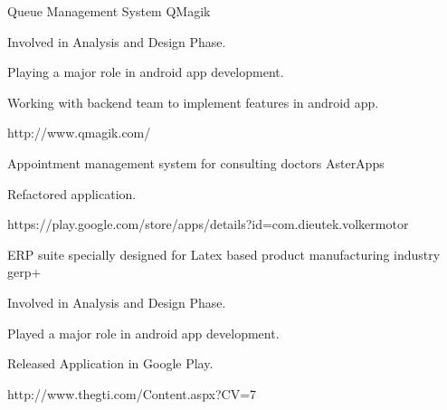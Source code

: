 

\begin{cventries}

\cventry
    {Queue Management System} %
    {QMagik} %
    {} %
    {} %
    {
      \begin{cvitems} %
        \item {Involved in Analysis and Design Phase.}
        \item {Playing a major role in android app development.}
        \item {Working with backend team to implement features in android app.}
        \item{http://www.qmagik.com/}
      \end{cvitems}
    }


\cventry
    {Appointment management system for consulting doctors} %
    {AsterApps} %
    {} %
    {} %
    {
      \begin{cvitems} %
        \item {Refactored application.}
        \item{https://play.google.com/store/apps/details?id=com.dieutek.volkermotor}
      \end{cvitems}
    }

\cventry
    {ERP suite specially designed for Latex based product manufacturing industry} %
    {gerp+ } %
    {} %
    {} %
    {
      \begin{cvitems} %
        \item {Involved in Analysis and Design Phase.}
        \item {Played a major role in android app development.}
        \item {Released Application in Google Play.}
        \item{http://www.thegti.com/Content.aspx?CV=7}
      \end{cvitems}
    }


\end{cventries}
